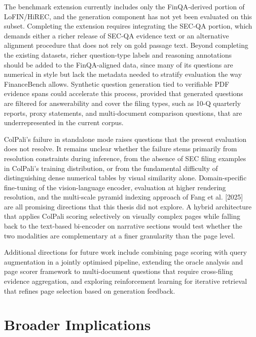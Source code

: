 \documentclass[12pt,twoside,maitrise]{dms}
\newcounter{example}
\theoremstyle{definition}
\numberwithin{equation}{section}
\numberwithin{table}{chapter}
\numberwithin{figure}{chapter}
\begin{document}
The benchmark extension currently includes only the FinQA-derived portion of
LoFIN/HiREC, and the generation component has not yet been evaluated on this subset.
Completing the extension requires integrating the SEC-QA portion, which demands either
a richer release of SEC-QA evidence text or an alternative alignment procedure that does
not rely on gold passage text. Beyond completing the existing datasets, richer question-type
labels and reasoning annotations should be added to the FinQA-aligned data, since many
of its questions are numerical in style but lack the metadata needed to stratify evaluation
the way FinanceBench allows. Synthetic question generation tied to verifiable PDF evidence
spans could accelerate this process, provided that generated questions are filtered for
answerability and cover the filing types, such as 10-Q quarterly reports, proxy statements,
and multi-document comparison questions, that are underrepresented in the current corpus.

ColPali's failure in standalone mode raises questions that the present evaluation does not
resolve. It remains unclear whether the failure stems primarily from resolution constraints
during inference, from the absence of SEC filing examples in ColPali's training distribution,
or from the fundamental difficulty of distinguishing dense numerical tables by visual
similarity alone. Domain-specific fine-tuning of the vision-language encoder, evaluation at
higher rendering resolution, and the multi-scale pyramid indexing approach of Fang et al.
[2025] are all promising directions that this thesis did not explore. A hybrid architecture
that applies ColPali scoring selectively on visually complex pages while falling back to the
text-based bi-encoder on narrative sections would test whether the two modalities are
complementary at a finer granularity than the page level.

Additional directions for future work include combining page scoring with query
augmentation in a jointly optimised pipeline, extending the oracle analysis and page scorer
framework to multi-document questions that require cross-filing evidence aggregation, and
exploring reinforcement learning for iterative retrieval that refines page selection based on
generation feedback.


\section{Broader Implications}
\end{document}
